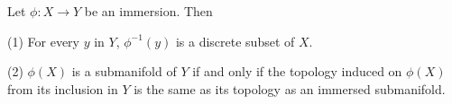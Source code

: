 Let $\phi: X \to Y$ be an immersion. Then

(1) For every $y$ in $Y$, $\phi^{-1}(y)$ is a discrete subset of $X$.

(2) $\phi(X)$ is a submanifold of $Y$ if and only if the topology induced on $\phi(X)$ from its inclusion in $Y$ is the same as its topology as an immersed submanifold.
